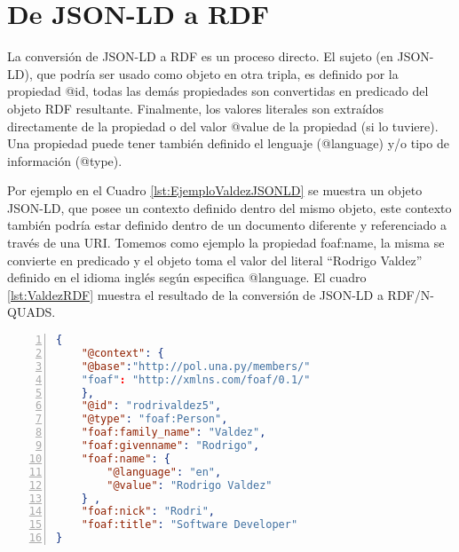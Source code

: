 \section{De JSON-LD a RDF}

La conversión de JSON-LD a RDF es un proceso directo. El sujeto (en JSON-LD), que podría ser usado como objeto en otra tripla, es definido por la propiedad @id, todas las demás propiedades son convertidas en predicado del objeto RDF resultante. Finalmente, los valores literales son extraídos directamente de la propiedad o del valor @value de la propiedad (si lo tuviere). Una propiedad puede tener también definido el lenguaje (@language) y/o tipo de información (@type).

Por ejemplo en el Cuadro \ref{lst:EjemploValdezJSONLD} se muestra un objeto JSON-LD, que posee un contexto definido dentro del mismo objeto, este contexto también podría estar definido dentro de un documento diferente y referenciado a través de una URI. Tomemos como ejemplo la propiedad foaf:name, la misma se convierte en predicado y el objeto toma el valor del literal “Rodrigo Valdez” definido en el idioma inglés según especifica @language. El cuadro \ref{lst:ValdezRDF} muestra el resultado de la conversión de JSON-LD a RDF/N-QUADS.


\noindent\begin{minipage}{\textwidth}
    \begin{lstlisting}[captionpos=b, caption=Objeto JSON-LD. , label=lst:EjemploValdezJSONLD, language=json,firstnumber=1,  numbers=left,  numberstyle=\tiny\color{mygray},frame=single]
{
    "@context": {
	"@base":"http://pol.una.py/members/"
	"foaf": "http://xmlns.com/foaf/0.1/"
	},
	"@id": "rodrivaldez5",
	"@type": "foaf:Person",
	"foaf:family_name": "Valdez",
	"foaf:givenname": "Rodrigo",
	"foaf:name": {
		"@language": "en",
		"@value": "Rodrigo Valdez"
	} ,
	"foaf:nick": "Rodri",
	"foaf:title": "Software Developer"
}

        \end{lstlisting}
    \end{minipage}


